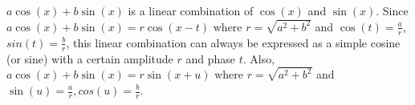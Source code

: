 $a \cos(x)+ b \sin(x)$ is a linear combination of $\cos(x)$ and $\sin(x)$.
Since $a \cos(x)+ b \sin(x)=r \cos(x-t)$ where $r= \sqrt{a^2 + b^2}$
and $\cos(t)=\frac{a}{r}$, $sin(t)=\frac{b}{r}$, this linear
combination can always be expressed as a simple cosine (or sine) with
a certain amplitude $r$ and phase $t$.
Also, $a \cos(x)+ b \sin(x)= r \sin(x+u)$ where  $ r= \sqrt{a^2 + b^2} $
and $\sin(u)=\frac{a}{r}, cos(u)=\frac{b}{r}$.